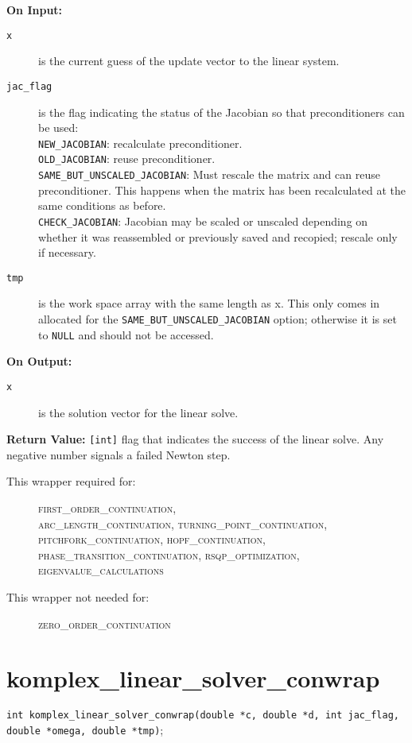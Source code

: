 {\bf On Input:}
\begin{description}
\item[\texttt{x}] is the current guess of the update vector to the linear system.
\item[\texttt{jac\_flag}] is the flag indicating the status of the Jacobian so that preconditioners can be used: \\
\texttt{NEW\_JACOBIAN}:   recalculate preconditioner.\\
\texttt{OLD\_JACOBIAN}:   reuse preconditioner.\\
\texttt{SAME\_BUT\_UNSCALED\_JACOBIAN}: Must rescale the matrix and can reuse preconditioner. This happens when the matrix has been recalculated at the same conditions as before.\\
\texttt{CHECK\_JACOBIAN}:   Jacobian may be scaled or unscaled depending on whether it was reassembled or previously saved and recopied; rescale only if necessary.
\item[\texttt{tmp}] is the work space array with the same length as x. This only comes in allocated for the \texttt{SAME\_BUT\_UNSCALED\_JACOBIAN} option; otherwise it is set to \texttt{NULL} and should not be accessed.
\end{description}

{\bf On Output:}
\begin{description}
\item[\texttt{x}] is the solution vector for the linear solve.
\end{description}

{\bf Return Value:} \texttt{[int]} flag that indicates the success of the linear solve. Any negative number signals a failed Newton step.

\begin{description}
\item[This wrapper required for:]
\textsc{ first\_order\_continuation, \\ arc\_length\_continuation,
turning\_point\_continuation, \\ pitchfork\_continuation, 
hopf\_continuation, \\ phase\_transition\_continuation,
rsqp\_optimization, \\ eigenvalue\_calculations}
\item[This wrapper not needed for:]
\textsc{zero\_order\_continuation}
\end{description}

\section{komplex\_linear\_solver\_conwrap}
\texttt{int komplex\_linear\_solver\_conwrap(double *c, double *d,
                  int jac\_flag, double *omega, double *tmp)}; \\

